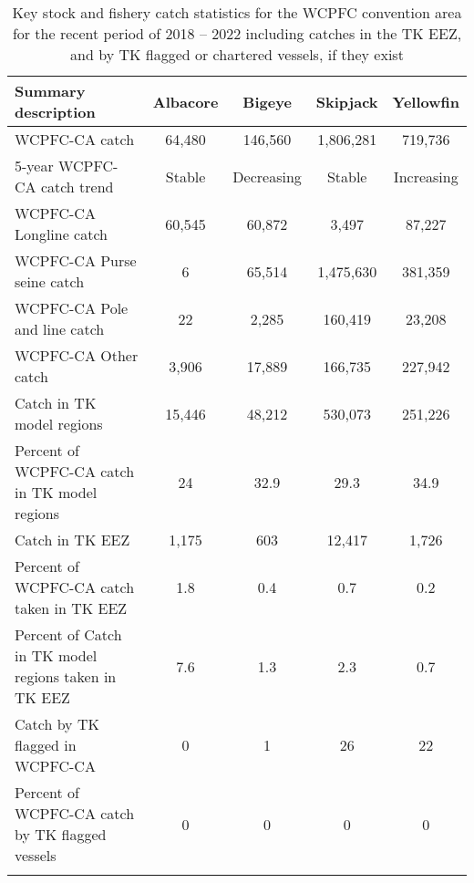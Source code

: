 \begin{longtable}{lcccc}
\caption{Key stock and fishery catch statistics for the WCPFC convention area for the recent period of 2018 -- 2022 including catches in the TK EEZ, and by TK flagged or chartered vessels, if they exist} \\ 
  \hline
Summary description & Albacore & Bigeye & Skipjack & Yellowfin \\ 
  \hline
WCPFC-CA catch & 64,480 & 146,560 & 1,806,281 & 719,736 \\ 
  5-year WCPFC-CA catch trend & Stable & Decreasing & Stable & Increasing \\ 
  WCPFC-CA Longline catch & 60,545 & 60,872 & 3,497 & 87,227 \\ 
  WCPFC-CA Purse seine catch & 6 & 65,514 & 1,475,630 & 381,359 \\ 
  WCPFC-CA Pole and line catch & 22 & 2,285 & 160,419 & 23,208 \\ 
  WCPFC-CA Other catch & 3,906 & 17,889 & 166,735 & 227,942 \\ 
  Catch in TK model regions & 15,446 & 48,212 & 530,073 & 251,226 \\ 
  Percent of WCPFC-CA catch in TK model regions & 24 & 32.9 & 29.3 & 34.9 \\ 
   \hline
Catch in TK EEZ & 1,175 & 603 & 12,417 & 1,726 \\ 
  Percent of WCPFC-CA catch taken in TK EEZ & 1.8 & 0.4 & 0.7 & 0.2 \\ 
  Percent of Catch in TK model regions taken in TK EEZ & 7.6 & 1.3 & 2.3 & 0.7 \\ 
  Catch by TK flagged in WCPFC-CA & 0 & 1 & 26 & 22 \\ 
  Percent of WCPFC-CA catch by TK flagged vessels & 0 & 0 & 0 & 0 \\ 
  \hline
\label{cat_sum_tab}
\end{longtable}
